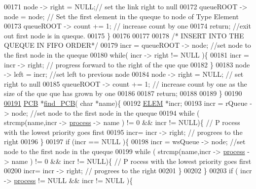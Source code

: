 \begin{DoxyCode}
00171                 node -> right = NULL;\textcolor{comment}{// set the link right to null}
00172                 queueROOT -> node = node; \textcolor{comment}{// Set the first element in the queque 
      to node of Type Element}
00173                 queueROOT -> count += 1; \textcolor{comment}{// increase count by one}
00174                 \textcolor{keywordflow}{return}; \textcolor{comment}{//exit out first node is in queque. }
00175         \}
00176         
00177         
00178         \textcolor{comment}{/* INSERT INTO THE QUEQUE IN FIFO ORDER*/}
00179         incr = queueROOT -> node; \textcolor{comment}{//set node to the first node in the queque}
00180         \textcolor{keywordflow}{while}( incr -> right != NULL )\{
00181                 incr = incr -> right; \textcolor{comment}{// progress forward to the right of the que
      que}
00182         \}
00183          node -> left = incr; \textcolor{comment}{//set left to previous node}
00184          node -> right = NULL; \textcolor{comment}{// set right to null }
00185          queueROOT -> count += 1; \textcolor{comment}{// increase count by one as the size of the que
      que has grown by one}
00186          
00187          \textcolor{keywordflow}{return};
00188 
00189 \}
00190 
\hypertarget{mpx__r2_8c_source_l00191}{}\hyperlink{mpx__r2_8h_a612a6abcb66c688a32f33abc93ff3990}{00191} \hyperlink{structprocess}{PCB} *\hyperlink{mpx__r2_8c_a612a6abcb66c688a32f33abc93ff3990}{find_PCB}( \textcolor{keywordtype}{char} *name)\{
00192         \hyperlink{structpage}{ELEM} *incr;
00193         incr =  rQueue -> node; \textcolor{comment}{//set node to the first node in the queque}
00194         \textcolor{keywordflow}{while} ( strcmp(name,incr -> \hyperlink{structprocess}{process} -> name ) != 0 && incr != NULL)\{ \textcolor{comment}{// P
      rocess with the lowest priority goes first }
00195                         incr= incr -> right; \textcolor{comment}{// progrees to the right }
00196         \}
00197         \textcolor{keywordflow}{if} (incr == NULL )\{
00198         incr =  wsQueue -> node; \textcolor{comment}{//set node to the first node in the queque}
00199         \textcolor{keywordflow}{while} ( strcmp(name,incr -> \hyperlink{structprocess}{process} -> name ) != 0 && incr != NULL)\{ \textcolor{comment}{// P
      rocess with the lowest priority goes first }
00200                         incr= incr -> right; \textcolor{comment}{// progrees to the right }
00201         \}
00202         \}
00203         \textcolor{keywordflow}{if} ( incr -> \hyperlink{structprocess}{process} != NULL && incr != NULL )\{

\end{DoxyCode}
